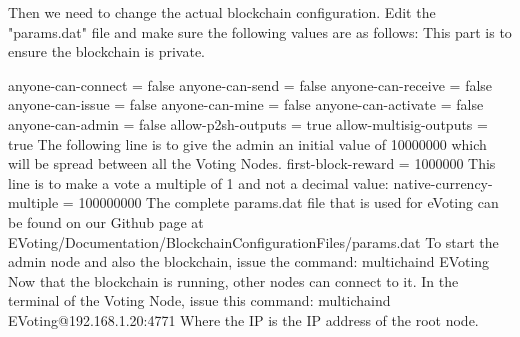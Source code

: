\documentclass[11pt]{article}
\begin{document}
	Then we need to change the actual blockchain configuration. Edit the "params.dat" file and make sure the following values are as follows:\newline\newline\newline
	This part is to ensure the blockchain is private.\newline
	
	anyone-can-connect = false\newline
	anyone-can-send = false\newline
	anyone-can-receive = false\newline
	anyone-can-issue = false\newline
	anyone-can-mine = false\newline
	anyone-can-activate = false\newline
	anyone-can-admin = false\newline
	allow-p2sh-outputs = true\newline
	allow-multisig-outputs = true\newline
	\newline
	The following line is to give the admin an initial value of 10000000 which will be spread between all the Voting Nodes.\newline
	first-block-reward = 1000000\newline\newline
	This line is to make a vote a multiple of 1 and not a decimal value:\newline
	native-currency-multiple = 100000000 \newline\newline
	The complete params.dat file that is used for eVoting can be found on our Github page at EVoting/Documentation/BlockchainConfigurationFiles/params.dat
	\newline\newline
	To start the admin node and also the blockchain, issue the command:\newline
	multichaind EVoting\newline
	Now that the blockchain is running, other nodes can connect to it. In the terminal of the Voting Node, issue this command:\newline
	multichaind EVoting@192.168.1.20:4771\newline
	Where the IP is the IP address of the root node.
\end{document}
